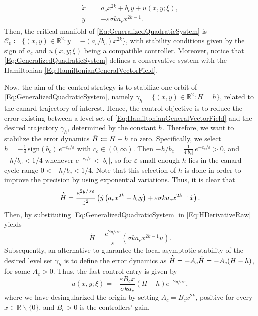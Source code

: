 \documentclass[3p]{elsarticle}
\theoremstyle{plain}
\theoremstyle{remark}
\theoremstyle{definition}
\begin{document}
    \begin{align}
        \begin{split}
            \dot{x} &= a_{c}x^{2k} + b_{c}y + u(x,y;\xi),  \\
            \dot{y} &= -\varepsilon \sigma k a_{c}x^{2k-1}.
        \end{split}
    \label{Eq:GeneralizedQuadraticSystem}
    \end{align}
    Then, the critical manifold of \eqref{Eq:GeneralizedQuadraticSystem} is $\mathcal{C}_{0} \coloneqq \{ (x, y) \in \mathbb{R}^{2}: y = -(a_{c}/b_{c})x^{2k} \}$, with stability conditions given by the sign of $a_{c}$ and $u(x,y;\xi)$ being a compatible controller. Moreover, notice that \eqref{Eq:GeneralizedQuadraticSystem} defines a conservative system with the Hamiltonian \eqref{Eq:HamiltonianGeneralVectorField}.
    
    Now, the aim of the control strategy is to stabilize one orbit of \eqref{Eq:GeneralizedQuadraticSystem}, namely $\gamma_{h}=\{ (x,y) \in \mathbb{R}^{2} : H=h \}$, related to the canard trajectory of interest. Hence, the control objective is to reduce the error existing between a level set of \eqref{Eq:HamiltonianGeneralVectorField} and the desired trajectory $\gamma_{h}$, determined by the constant $h$. Therefore, we want to stabilize the error dynamics $\Tilde{H} \coloneqq H - h$ to zero. Specifically, we select $h = -\tfrac{1}{4}\,\mathrm{sign}(b_c)\,e^{-c_c/\varepsilon}$ with $c_c \in (0,\infty)$.
Then $-h/b_c = \tfrac{1}{4|b_c|}\,e^{-c_c/\varepsilon} > 0$, and $-h/b_c < 1/4$ whenever
$e^{-c_c/\varepsilon} < |b_c|$, so for $\varepsilon$ small enough $h$ lies in the canard-cycle
range $0 < -h/b_c < 1/4$. Note that this selection of $h$ is done in order to improve the precision by using exponential variations. Thus, it is clear that
    \begin{equation}
            \dot{\Tilde{H}} = \frac{e^{2y/\sigma \varepsilon}}{\varepsilon^{2}}\left( \dot{y}\left( a_{c}x^{2k} + b_{c}y \right) + \varepsilon \sigma k a_{c}x^{2k-1}\dot{x} \right).
            \label{Eq:HDerivativeRaw}
        \end{equation}
        Then, by substituting \eqref{Eq:GeneralizedQuadraticSystem} in \eqref{Eq:HDerivativeRaw} yields
        \begin{equation}
            \dot{\tilde{H}} = \frac{e^{2y/\sigma \varepsilon}}{\varepsilon}\left(\sigma k a_{c}x^{2k-1}u \right).
            \label{Eq:HDerivativeControl}
        \end{equation}
        Subsequently, an alternative to guarantee the local asymptotic stability of the desired level set $\gamma_{h}$ is to define the error dynamics as $\dot{\Tilde{H}} = -A_{c}\Tilde{H} = -A_{c}(H - h)$, for some $A_{c} > 0$. Thus, the fast control entry is given by
        \begin{equation}
            u(x,y;\xi) = -\frac{\varepsilon B_{c} x}{\sigma k a_{c}}(H-h)e^{-2y/\sigma \varepsilon},
            \label{Eq:FastControlEntry}
        \end{equation}
        where we have desingularized the origin by setting $A_{c} = B_{c}x^{2k}$, positive for every $x\in\mathbb{R}\backslash\{0\}$, and $B_{c}>0$ is the controllers' gain. 
        
\end{document}

